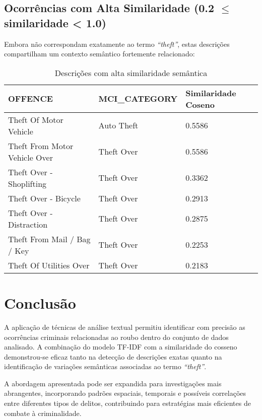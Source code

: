 \documentclass[12pt]{article}
\begin{document}
\subsection{Ocorrências com Alta Similaridade (0.2 $\leq$ similaridade < 1.0)}

Embora não correspondam exatamente ao termo \textit{``theft''}, estas descrições compartilham um contexto semântico fortemente relacionado:

\begin{table}[h!]
\centering
\caption{Descrições com alta similaridade semântica}
\begin{tabular}{lll}
\toprule
\textbf{OFFENCE} & \textbf{MCI\_CATEGORY} & \textbf{Similaridade Coseno} \\
\midrule
Theft Of Motor Vehicle & Auto Theft & 0.5586 \\
Theft From Motor Vehicle Over & Theft Over & 0.5586 \\
Theft Over - Shoplifting & Theft Over & 0.3362 \\
Theft Over - Bicycle & Theft Over & 0.2913 \\
Theft Over - Distraction & Theft Over & 0.2875 \\
Theft From Mail / Bag / Key & Theft Over & 0.2253 \\
Theft Of Utilities Over & Theft Over & 0.2183 \\
\bottomrule
\end{tabular}
\end{table}

\section{Conclusão}

A aplicação de técnicas de análise textual permitiu identificar com precisão as ocorrências criminais relacionadas ao roubo dentro do conjunto de dados analisado. A combinação do modelo TF-IDF com a similaridade do cosseno demonstrou-se eficaz tanto na detecção de descrições exatas quanto na identificação de variações semânticas associadas ao termo \textit{``theft''}.

A abordagem apresentada pode ser expandida para investigações mais abrangentes, incorporando padrões espaciais, temporais e possíveis correlações entre diferentes tipos de delitos, contribuindo para estratégias mais eficientes de combate à criminalidade.
\end{document}
